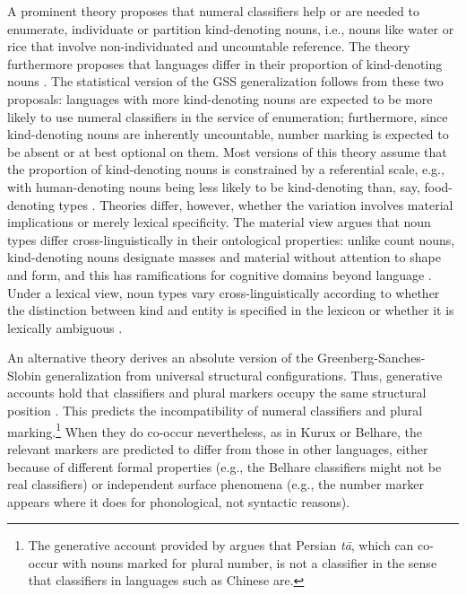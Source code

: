 \documentclass[11pt]{article}
\begin{document}
A prominent theory proposes that numeral classifiers help or are needed to enumerate, individuate or partition kind-denoting nouns, i.e., nouns like {\sc water} or {\sc rice} that involve non-individuated and uncountable reference.
The theory furthermore proposes that languages differ in their proportion of kind-denoting nouns \citep{Quine1960,Silverstein1976,Lucy1992, Croft1994,Krifka1995}. 
The statistical version of the GSS generalization follows from these two proposals: languages with more kind-denoting nouns are expected to be more likely to use numeral classifiers in the service of enumeration; furthermore, since kind-denoting nouns are inherently uncountable, number marking is expected to be absent or at best optional on them. 
Most versions of this theory assume that the proportion of kind-denoting nouns is constrained by a referential scale, e.g., with human-denoting nouns being less likely to be kind-denoting than, say, food-denoting types \citep{Lucy1992}. Theories differ, however, whether the variation involves material implications or merely lexical specificity. The material view argues that noun types differ cross-linguistically in their ontological properties: unlike count nouns, kind-denoting nouns designate masses and material without attention to shape and form, and this has ramifications for cognitive domains beyond language \citep{Cassirer1923,Lucy1992,ImaiGentner1997}. Under a lexical view, noun types vary cross-linguistically according to whether the distinction between kind and entity is specified in the lexicon or whether it is lexically ambiguous \citep{Bisang2002,Bisang2017}.

An alternative theory derives an absolute version of the Greenberg-Sanches-Slobin generalization from universal structural configurations. Thus, generative accounts hold that classifiers and plural markers occupy the same structural position \citep{Borer2005}. This predicts the incompatibility of numeral classifiers and plural marking.\footnote{The generative account provided by \citet{Gebhardt2018} argues that Persian {\it t\=a}, which can co-occur with nouns marked for plural number, is not a classifier in the sense that classifiers in languages such as Chinese are.} When they do co-occur nevertheless, as in Kurux or Belhare, the relevant markers are predicted to differ from those in other languages, either because of different formal properties (e.g., the Belhare classifiers might not be real classifiers) or independent surface phenomena (e.g., the number marker appears where it does for phonological, not syntactic reasons).
\end{document}
